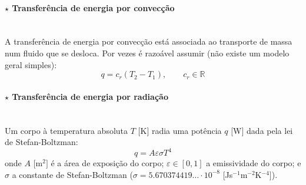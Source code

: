 \vspace{-1em}
\paragraph[3.3.1.2 Transferência de energia por convecção]{$\pmb{\star}$ Transferência de energia por convecção}\mbox{}\\
A transferência de energia por convecção está associada ao transporte de massa num fluido que se desloca. Por vezes é razoável assumir (não existe um modelo geral simples):
$$
    q = c_r (T_2 - T_1),\qquad c_r \in \mathbb{R}
$$

\vspace{-1em}
\paragraph[3.3.1.2 Transferência de energia por radiação]{$\pmb{\star}$ Transferência de energia por radiação}\mbox{}\\
Um corpo à temperatura absoluta $T$ $[$K$]$ radia uma potência $q$ $[$W$]$ dada pela lei de Stefan-Boltzman:
$$
    q = A \varepsilon \sigma T^4
$$
onde $A$ $[$m$^2]$ é a área de exposição do corpo; $\varepsilon \in [0,1]$ a emissividade do corpo; e $\sigma$ a constante de Stefan-Boltzman ($\sigma = 5.670374419\hdots \cdot 10^{-8}$ $[$Js$^{-1}$m$^{-2}$K$^{-4}]$). 
